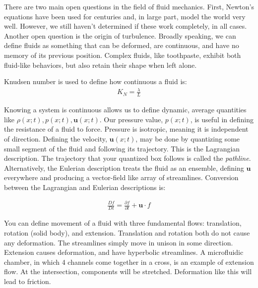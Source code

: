 \documentclass[12pt]{report}
\begin{document}
There are two main open questions in the field of fluid mechanics. First, Newton's equations have been used for centuries and, in large part, model the world very well. However, we still haven't determined if these work completely, in all cases. Another open question is the origin of turbulence. Broadly speaking, we can define fluids as something that can be deformed, are continuous, and have no memory of its previous position. Complex fluids, like toothpaste, exhibit both fluid-like behaviors, but also retain their shape when left alone. \newline

Knudsen number is used to define how continuous a fluid is: 
\begin{equation} \label{knum}
\begin{split}
K_N = \frac{\lambda}{L}
\end{split}
\end{equation}

Knowing a system is continuous allows us to define dynamic, average quantities like $\rho(x;t), p(x;t), \mathbf{u}(x;t)$. Our pressure value, $p(x;t)$, is useful in defining the resistance of a fluid to force. Pressure is isotropic, meaning it is independent of direction. Defining the velocity, $\mathbf{u}(x;t)$, may be done by quantizing some small segment of the fluid and following its trajectory. This is the Lagrangian description. The trajectory that your quantized box follows is called the \textit{pathline}. Alternatively, the Eulerian description treats the fluid as an ensemble, defining $\mathbf{u}$ everywhere and producing a vector-field like array of streamlines. Conversion between the Lagrangian and Eulerian descriptions is:\newline

\begin{equation} \label{LtoE}
\begin{split}
\frac{Df}{Dt} = \frac{\partial f}{\partial t} + \mathbf{u}\cdot f
\end{split}
\end{equation}

You can define movement of a fluid with three fundamental flows: translation, rotation (solid body), and extension. Translation and rotation both do not cause any deformation. The streamlines simply move in unison in some direction. Extension causes deformation, and have hyperbolic streamlines. A microfluidic chamber, in which 4 channels come together in a cross, is an example of extension flow. At the intersection, components will be stretched. Deformation like this will lead to friction.\newline
\end{document}
